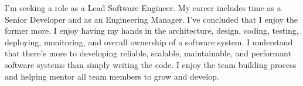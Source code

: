 

\begin{cvparagraph}
I'm seeking a role as a Lead Software Engineer.  My career includes
time as a Senior Developer and as an Engineering Manager. I've
concluded that I enjoy the former more.  I enjoy having my hands in
the architecture, design, coding, testing, deploying, monitoring, and
overall ownership of a software system.  I understand that there's
more to developing reliable, scalable, maintainable, and performant
software systems than simply writing the code.  I enjoy the team
building process and helping mentor all team members to grow and
develop.
\end{cvparagraph}
